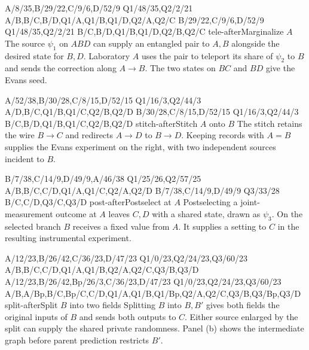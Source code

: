   {A/8/35,B/29/22,C/9/6,D/52/9}
  {Q1/48/35,Q2/2/21}
  {A/B,B/C,B/D,Q1/A,Q1/B,Q1/D,Q2/A,Q2/C}
  {B/29/22,C/9/6,D/52/9}
  {Q1/48/35,Q2/2/21}
  {B/C,B/D,Q1/B,Q1/D,Q2/B,Q2/C}
  {tele-after}{Marginalize \(A\)}
  {The source \(\psi_1\) on \(ABD\) can supply an entangled pair to
   \(A,B\) alongside the desired state for \(B,D\). Laboratory \(A\)
   uses the pair to teleport its share of \(\psi_2\) to \(B\) and
   sends the correction along \(A\to B\). The two states on \(BC\)
   and \(BD\) give the Evans seed.}

  {A/52/38,B/30/28,C/8/15,D/52/15}
  {Q1/16/3,Q2/44/3}
  {A/D,B/C,Q1/B,Q1/C,Q2/B,Q2/D}
  {B/30/28,C/8/15,D/52/15}
  {Q1/16/3,Q2/44/3}
  {B/C,B/D,Q1/B,Q1/C,Q2/B,Q2/D}
  {stitch-after}{Stitch \(A\) onto \(B\)}
  {The stitch retains the wire \(B\to C\) and redirects \(A\to D\)
   to \(B\to D\). Keeping records with \(A=B\) supplies the Evans
   experiment on the right, with two independent sources incident to \(B\).}

  {B/7/38,C/14/9,D/49/9,A/46/38}
  {Q1/25/26,Q2/57/25}
  {A/B,B/C,C/D,Q1/A,Q1/C,Q2/A,Q2/D}
  {B/7/38,C/14/9,D/49/9}
  {Q3/33/28}
  {B/C,C/D,Q3/C,Q3/D}
  {post-after}{Postselect at \(A\)}
  {Postselecting a joint-measurement outcome at \(A\) leaves \(C,D\)
   with a shared state, drawn as \(\psi_3\). On the selected branch
   \(B\) receives a fixed value from \(A\). It supplies a setting to \(C\)
   in the resulting instrumental experiment.}

  {A/12/23,B/26/42,C/36/23,D/47/23}
  {Q1/0/23,Q2/24/23,Q3/60/23}
  {A/B,B/C,C/D,Q1/A,Q1/B,Q2/A,Q2/C,Q3/B,Q3/D}
  {A/12/23,B/26/42,Bp/26/3,C/36/23,D/47/23}
  {Q1/0/23,Q2/24/23,Q3/60/23}
  {A/B,A/Bp,B/C,Bp/C,C/D,Q1/A,Q1/B,Q1/Bp,Q2/A,Q2/C,Q3/B,Q3/Bp,Q3/D}
  {split-after}{Split \(B\) into two fields}
  {Splitting \(B\) into \(B,B'\) gives both fields the original inputs
   of \(B\) and sends both outputs to \(C\). Either source enlarged by the
   split can supply the shared private randomness. Panel (b) shows the
   intermediate graph before parent prediction restricts \(B'\).}

